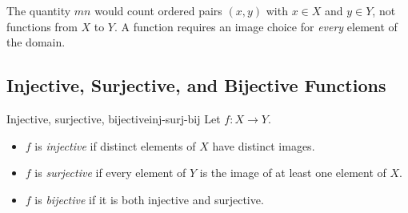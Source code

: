 \begin{commonmistake}[title={Why the answer is $n^m$, not $mn$}]
The quantity $mn$ would count ordered pairs $(x,y)$ with $x\in X$ and $y\in Y$, not functions from $X$ to $Y$. A function requires an image choice for \emph{every} element of the domain.
\end{commonmistake}

\subsection{Injective, Surjective, and Bijective Functions}

\begin{definition}{Injective, surjective, bijective}{inj-surj-bij}
Let $f:X\to Y$.
\begin{itemize}[leftmargin=*]
    \item $f$ is \emph{injective} if distinct elements of $X$ have distinct images.
    \item $f$ is \emph{surjective} if every element of $Y$ is the image of at least one element of $X$.
    \item $f$ is \emph{bijective} if it is both injective and surjective.
\end{itemize}
\end{definition}


